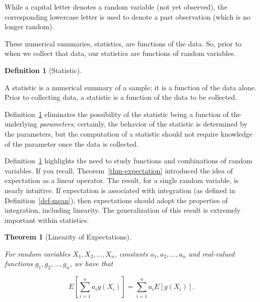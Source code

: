 \documentclass[
  letterpaper,
  DIV=11,
  numbers=noendperiod]{scrreprt}
\theoremstyle{plain}
\newtheorem{theorem}{Theorem}[chapter]
\theoremstyle{definition}
\newtheorem{definition}{Definition}[chapter]
\theoremstyle{definition}
\theoremstyle{remark}
\begin{document}
\begin{tcolorbox}[enhanced jigsaw, toprule=.15mm, left=2mm, title=\textcolor{quarto-callout-note-color}{\faInfo}\hspace{0.5em}{Note}, opacityback=0, toptitle=1mm, leftrule=.75mm, colbacktitle=quarto-callout-note-color!10!white, opacitybacktitle=0.6, titlerule=0mm, breakable, colframe=quarto-callout-note-color-frame, arc=.35mm, coltitle=black, bottomtitle=1mm, rightrule=.15mm, colback=white, bottomrule=.15mm]

While a capital letter denotes a random variable (not yet observed), the
corresponding lowercase letter is used to denote a past observation
(which is no longer random).

\end{tcolorbox}

These numerical summaries, statistics, are functions of the data. So,
prior to when we collect that data, our statistics are functions of
random variables.

\begin{definition}[Statistic]\protect\hypertarget{def-statistic}{}\label{def-statistic}

A statistic is a numerical summary of a sample; it is a function of the
data alone. Prior to collecting data, a statistic is a function of the
data to be collected.

\end{definition}

Definition~\ref{def-statistic} eliminates the possibility of the
statistic being a function of the underlying \emph{parameters};
certainly, the behavior of the statistic is determined by the
parameters, but the computation of a statistic should not require
knowledge of the parameter once the data is collected.

Definition~\ref{def-statistic} highlights the need to study functions
and combinations of random variables. If you recall,
Theorem~\ref{thm-expectation} introduced the idea of expectation as a
linear operator. The result, for a single random variable, is nearly
intuitive. If expectation is associated with integration (as defined in
Definition~\ref{def-mean}), then expectations should adopt the
properties of integration, including linearity. The generalization of
this result is extremely important within statistics.

\begin{theorem}[Linearity of
Expectations]\protect\hypertarget{thm-linearity-of-expectations}{}\label{thm-linearity-of-expectations}

For random variables \(X_1, X_2, \dotsc, X_n\), constants
\(a_1, a_2, \dotsc, a_n\) and real-valued functions
\(g_1, g_2, \dotsc, g_n\), we have that

\[E\left[\sum_{i=1}^{n} a_i g\left(X_i\right)\right] = \sum_{i=1}^{n} a_i E\left[g\left(X_i\right)\right].\]

\end{theorem}
\end{document}
